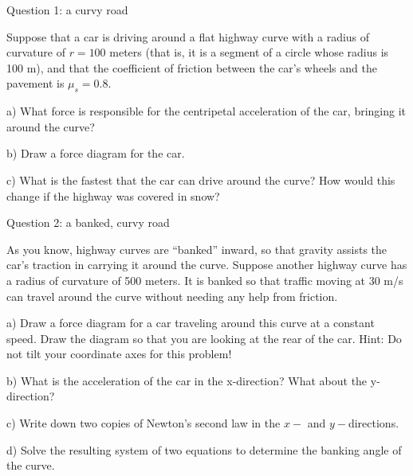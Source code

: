 \documentclass[12pt]{article}
\begin{document}
\Large
\centerline{}
\normalsize
\centerline{}

\medskip

\centerline{\Large Question 1: a curvy road}

Suppose that a car is driving around a flat highway curve with a radius of curvature of $r=100$ meters (that is, it is a segment of a circle whose
radius is 100 m), and that
the coefficient of friction between the car's wheels and the pavement is $\mu_s=0.8$.

a) What force is responsible for the centripetal acceleration of the car, bringing it around the curve?

\vspace{1in}


b) Draw a force diagram for the car.

\vspace{3in}

c) What is the fastest that the car can drive around the curve? How would this change if the highway
was covered in snow?

\vspace{2in}

\newpage

\centerline{\Large Question 2: a banked, curvy road}

As you know, highway curves are ``banked'' inward, so that gravity assists the car's traction in 
carrying it around the curve. Suppose another highway curve has a radius of curvature of 500 meters. 
It is banked so that traffic moving at 30 m/s can travel around the curve without
needing any help from friction.

a) Draw a force diagram for a car traveling around this curve at a constant speed. Draw the
diagram so that you are looking at the rear of the car. Hint: Do not tilt your coordinate axes for
this problem!

\vspace{3in}

b) What is the acceleration of the car in the x-direction? What about the y-direction?

\vspace{1in}

c) Write down two copies of Newton's second law in the $x-$ and $y-$directions.

\vspace{2in}

d) Solve the resulting system of two equations to determine the banking angle of the curve.
\end{document}

